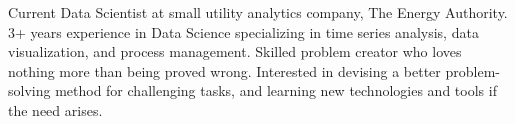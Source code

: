 

\begin{cvparagraph}

Current Data Scientist at small utility analytics company, The Energy Authority. 3+ years experience in Data Science specializing in time series analysis, data visualization, and process management. Skilled problem creator who loves nothing more than being proved wrong. Interested in devising a better problem-solving method for challenging tasks, and learning new technologies and tools if the need arises.
\end{cvparagraph}
